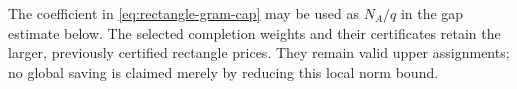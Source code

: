 The coefficient in \eqref{eq:rectangle-gram-cap} may be used as
$N_A/q$ in the gap estimate below. The selected completion weights
and their certificates retain the larger, previously certified
rectangle prices. They remain valid upper assignments; no global
saving is claimed merely by reducing this local norm bound.
